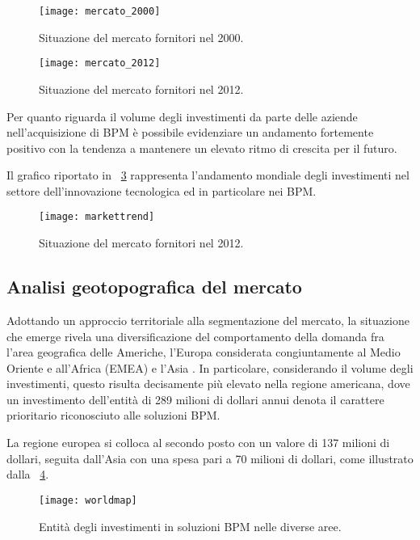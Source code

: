 \begin{figure}[H]
  \centering
  \texttt{[image: mercato\_2000]}
  \caption{Situazione del mercato fornitori nel 2000.}
  \label{fig:mercato2000}
\end{figure}

\begin{figure}[H]
  \centering
  \texttt{[image: mercato\_2012]}
  \caption{Situazione del mercato fornitori nel 2012.}
  \label{fig:mercato2012}
\end{figure}

Per quanto riguarda il volume degli investimenti da parte delle aziende nell'acquisizione di \sw BPM è possibile evidenziare un andamento fortemente positivo con la tendenza a mantenere un elevato ritmo di crescita per il futuro.

Il grafico riportato in \figurename~\ref{fig:trend} rappresenta l'andamento mondiale degli investimenti nel settore dell'innovazione tecnologica ed in particolare nei \sw BPM.

\begin{figure}[H]
  \centering
  \texttt{[image: markettrend]}
  \caption{Situazione del mercato fornitori nel 2012.}
  \label{fig:trend}
\end{figure}

\subsection{Analisi geotopografica del mercato}%
Adottando un approccio territoriale alla segmentazione del mercato, la situazione che emerge rivela una diversificazione del comportamento della domanda fra l'area geografica delle Americhe, l'Europa considerata congiuntamente al Medio Oriente e all'Africa (EMEA) e l'Asia \cite{bea:bpm}. In particolare, considerando il volume degli investimenti, questo risulta decisamente più elevato nella regione americana, dove un investimento dell'entità di 289 milioni di dollari annui denota il carattere prioritario riconosciuto alle soluzioni BPM\@.

La regione europea si colloca al secondo posto con un valore di 137 milioni di dollari, seguita dall'Asia con una spesa pari a 70 milioni di dollari, come illustrato dalla \figurename~\ref{fig:map1}.

\begin{figure}[H]
  \centering
  \texttt{[image: worldmap]}
  \caption{Entità degli investimenti in soluzioni BPM nelle diverse aree.}
  \label{fig:map1}
\end{figure}

